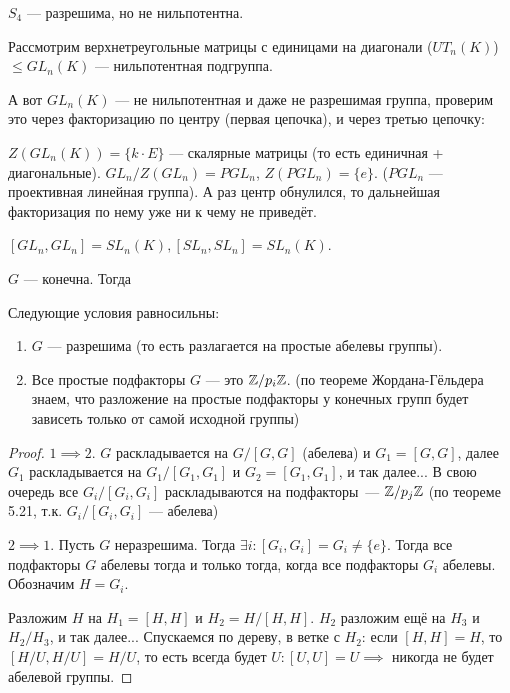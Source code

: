 \begin{example}
    $S_4$ --- разрешима, но не нильпотентна.
\end{example}
\begin{example}
	Рассмотрим верхнетреугольные матрицы {\color{red} с единицами на диагонали}  ($UT_n(K)$) $\le GL_n(K)$  --- {\color{red} нильпотентная} подгруппа.

    А вот $GL_n(K)$ --- не нильпотентная и даже не разрешимая группа, проверим это через факторизацию по центру (первая цепочка), и через третью цепочку:

    $Z(GL_n(K)) = \{k\cdot E\}$ --- скалярные матрицы (то есть единичная + диагональные).  $GL_n / Z(GL_n) = PGL_n$,  $Z(PGL_n) = \{e\}$. ($PGL_n$ --- проективная линейная группа). А раз центр обнулился, то дальнейшая факторизация по нему уже ни к чему не приведёт. 

     $[GL_n, GL_n] = SL_n(K), [SL_n, SL_n] = SL_n(K)$.
\end{example}
\begin{theorem}
    $G$ --- конечна. Тогда

    Следующие условия равносильны:
    \begin{enumerate}
        \item $G$ --- разрешима (то есть разлагается на простые абелевы группы).
        \item Все простые подфакторы $G$ --- это  $\mathbb{Z} / p_i \mathbb{Z}$. (по теореме Жордана-Гёльдера знаем, что разложение на простые подфакторы у конечных групп будет зависеть только от самой исходной группы)
    \end{enumerate}
\end{theorem}
\begin{proof}
	$1 \implies 2$. $G$ раскладывается на $G / [G, G]$ (абелева) и $G_1 = [G, G]$, далее $G_1$ раскладывается на $G_1 / [G_1, G_1]$ и $G_2 = [G_1, G_1]$, и так далее... В свою очередь все $G_i / [G_i, G_i]$ раскладываются на подфакторы~--- $\mathbb{Z} / p_j \mathbb{Z}$ (по теореме 5.21, т.к. $G_i / [G_i, G_i]$ --- абелева)

    $2 \implies 1$. Пусть $G$ неразрешима. Тогда  $\exists i\!: [G_i, G_i] = G_i \neq \{e\}$. Тогда все подфакторы  $G$ абелевы тогда и только тогда, когда все подфакторы  $G_i$ абелевы. Обозначим $H = G_i$.

    Разложим  $H$ на $H_1 = [H, H]$ и $H_2 = H / [H, H]$. $H_2$ разложим ещё на $H_3$ и $H_2 / H_3$, и так далее... Спускаемся по дереву, в ветке с $H_2$: если $[H, H] = H$, то $[H / U, H / U] = H / U$, то есть всегда будет $U: [U, U] = U \implies$ никогда не будет абелевой группы.
\end{proof}

